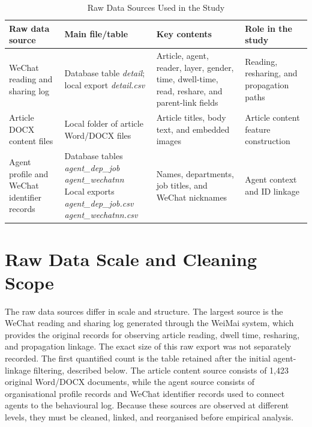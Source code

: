 \begin{table}[H]
\centering
\scriptsize
\caption{Raw Data Sources Used in the Study}
\label{tab:3-1}
\renewcommand{\arraystretch}{1.15}
\begin{tabularx}{\textwidth}{>{\raggedright\arraybackslash}p{}>{\raggedright\arraybackslash}p{}>{\raggedright\arraybackslash}p{}>{\raggedright\arraybackslash}p{}}
\toprule
\textbf{Raw data source} & \textbf{Main file/table} & \textbf{Key contents} & \textbf{Role in the study} \\
\midrule
WeChat reading and sharing log & Database table \emph{detail}; local export \emph{detail.csv} & Article, agent, reader, layer, gender, time, dwell-time, read, reshare, and parent-link fields & Reading, resharing, and propagation paths \\
Article DOCX content files & Local folder of article Word/DOCX files & Article titles, body text, and embedded images & Article content feature construction \\
Agent profile and WeChat identifier records & \makecell[l]{Database tables\\ \emph{agent\_dep\_job}\\ \emph{agent\_wechatnn}\\ Local exports\\ \emph{agent\_dep\_job.csv}\\ \emph{agent\_wechatnn.csv}} & Names, departments, job titles, and WeChat nicknames & Agent context and ID linkage \\
\bottomrule
\end{tabularx}
\end{table}

\section{Raw Data Scale and Cleaning Scope}
\label{sec:3-3-raw-data-scale-and-cleaning-scope}

The raw data sources differ in scale and structure. The largest source is the WeChat reading and sharing log generated through the WeiMai system, which provides the original records for observing article reading, dwell time, resharing, and propagation linkage. The exact size of this raw export was not separately recorded. The first quantified count is the table retained after the initial agent-linkage filtering, described below. The article content source consists of 1,423 original Word/DOCX documents, while the agent source consists of organisational profile records and WeChat identifier records used to connect agents to the behavioural log. Because these sources are observed at different levels, they must be cleaned, linked, and reorganised before empirical analysis.

